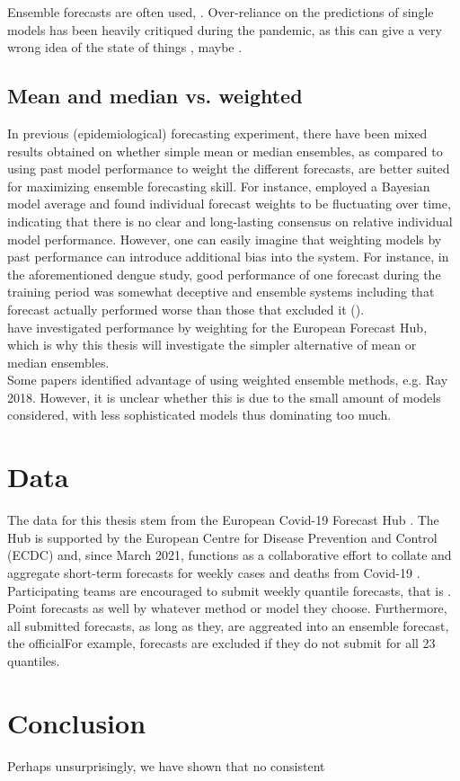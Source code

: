 \documentclass[11pt]{article}
\begin{document}
Ensemble forecasts are often used, . Over-reliance on the predictions of single models has been heavily critiqued during the pandemic, as this can give a very wrong idea of the state of things \citep{ioannidis_forecasting_2022}, maybe \citep{zelner_accounting_2021}.

\subsection{Mean and median vs. weighted}
In previous (epidemiological) forecasting experiment, there have been mixed results obtained on whether simple mean or median ensembles, as compared to using past model performance to weight the different forecasts, are better suited for maximizing ensemble forecasting skill. For instance, \cite{yamana_superensemble_2016} employed a Bayesian model average and found individual forecast weights to be fluctuating over time, indicating that there is no clear and long-lasting consensus on relative individual model performance. However, one can easily imagine that weighting models by past performance can introduce additional bias into the system. For instance, in the aforementioned dengue study, good performance of one forecast during the training period was somewhat deceptive and ensemble systems including that forecast actually performed worse than those that excluded it (\cite{yamana_superensemble_2016}).\\
\cite{sherratt_draft_nodate} have investigated performance by weighting for the European Forecast Hub, which is why this thesis will investigate the simpler alternative of mean or median ensembles. \\
Some papers identified advantage of using weighted ensemble methods, e.g. Ray 2018. However, it is unclear whether this is due to the small amount of models considered, with less sophisticated models thus dominating too much.
\section{Data}
The data for this thesis stem from the European Covid-19 Forecast Hub \cite{noauthor_european_2021}. The Hub is supported by the European Centre for Disease Prevention and Control (ECDC) and, since March 2021, functions as a collaborative effort to collate and aggregate short-term forecasts for weekly cases and deaths from Covid-19 \citep{sherratt_draft_nodate}. Participating teams are encouraged to submit weekly quantile forecasts, that is . Point forecasts as well by whatever method or model they choose. Furthermore, all submitted forecasts, as long as they, are aggreated into an ensemble forecast, the officialFor example, forecasts are excluded if they do not submit for all 23 quantiles.
\section{Conclusion}
Perhaps unsurprisingly, we have shown that no consistent 
\newpage

\end{document}
